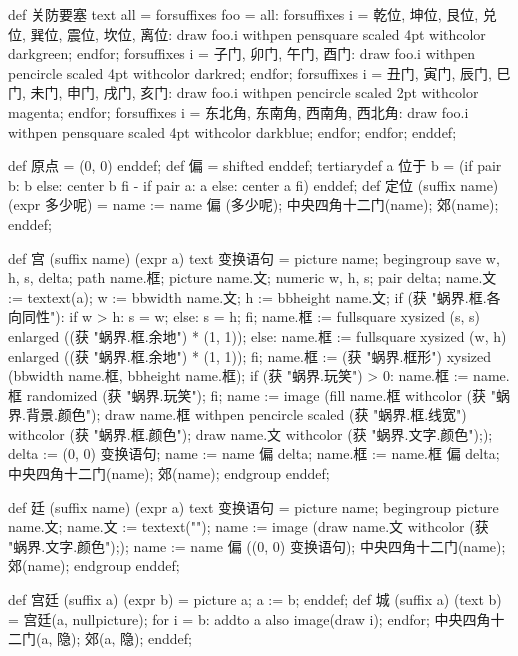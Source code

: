 def 关防要塞 text all =
  forsuffixes foo = all:
    forsuffixes i = 乾位, 坤位, 艮位, 兑位, 巽位, 震位, 坎位, 离位:
      draw foo.i withpen pensquare scaled 4pt withcolor darkgreen;
    endfor;
    forsuffixes i = 子门, 卯门, 午门, 酉门:
      draw foo.i withpen pencircle scaled 4pt withcolor darkred;
    endfor;
    forsuffixes i = 丑门, 寅门, 辰门, 巳门, 未门, 申门, 戌门, 亥门:
      draw foo.i withpen pencircle scaled 2pt withcolor magenta;
    endfor;
    forsuffixes i = 东北角, 东南角, 西南角, 西北角:
      draw foo.i withpen pensquare scaled 4pt withcolor darkblue;
    endfor;
  endfor;
enddef;
\stopMPinclusions

\startMPinclusions[+]
def 原点 = (0, 0) enddef;
def 偏 = shifted enddef;
tertiarydef a 位于 b =
  (if pair b: b else: center b fi - if pair a: a else: center a fi)
enddef;
def 定位 (suffix name) (expr 多少呢) =
  name := name 偏 (多少呢);
  中央四角十二门(name); 郊(name);
enddef;
\stopMPinclusions

\startMPinclusions[+]
def 宫 (suffix name) (expr a) text 变换语句 =
  picture name;
  begingroup
  save w, h, s, delta;
  path name.框; picture name.文; numeric w, h, s; pair delta;
  name.文 := textext(a);
  w := bbwidth name.文; h := bbheight name.文;
  if (获 "蜗界.框.各向同性"):
    if w > h: s = w; else: s = h; fi;
    name.框 := fullsquare xysized (s, s) enlarged ((获 "蜗界.框.余地") * (1, 1));
  else:
    name.框 := fullsquare xysized (w, h) enlarged ((获 "蜗界.框.余地") * (1, 1));
  fi;
  name.框 := (获 "蜗界.框形") xysized (bbwidth name.框, bbheight name.框);
  if (获 "蜗界.玩笑") > 0: name.框 := name.框 randomized (获 "蜗界.玩笑"); fi;
  name := image (fill name.框 withcolor (获 "蜗界.背景.颜色");
                 draw name.框 withpen pencircle scaled (获 "蜗界.框.线宽")
                         withcolor (获 "蜗界.框.颜色");
                 draw name.文 withcolor (获 "蜗界.文字.颜色"););
  delta := (0, 0) 变换语句;
  name := name 偏 delta;
  name.框 := name.框 偏 delta;
  中央四角十二门(name); 郊(name);
  endgroup
enddef;
\stopMPinclusions

\startMPinclusions[+]
def 廷 (suffix name) (expr a) text 变换语句 =
  picture name;
  begingroup
    picture name.文; name.文 := textext("");
    name := image (draw name.文 withcolor (获 "蜗界.文字.颜色"););
    name := name 偏 ((0, 0) 变换语句); 
    中央四角十二门(name); 郊(name);
  endgroup
enddef;
\stopMPinclusions

\startMPinclusions[+]
def 宫廷 (suffix a) (expr b) = picture a; a := b; enddef;
def 城 (suffix a) (text b) =
  宫廷(a, nullpicture);
  for i = b: addto a also image(draw i); endfor;
  中央四角十二门(a, 隐); 郊(a, 隐);
enddef;
\stopMPinclusions

